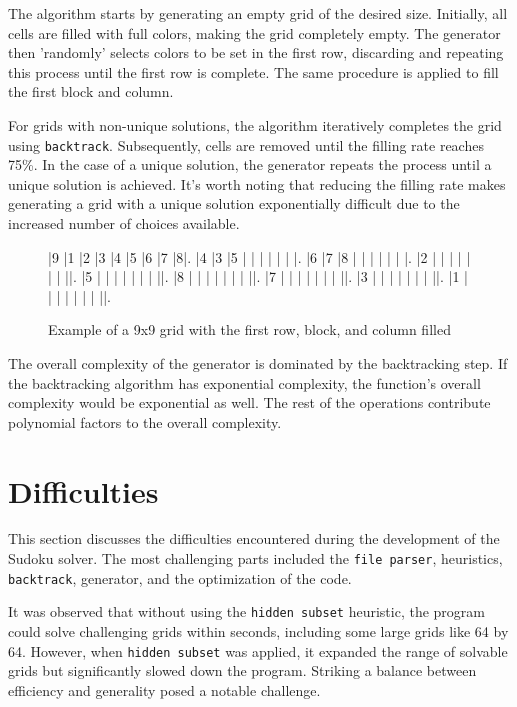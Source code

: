\documentclass[a4paper, 11pt]{article}
\begin{document}
The algorithm starts by generating an empty grid of the desired size. Initially, all cells are filled with full colors, making the grid completely empty. The generator then 'randomly' selects colors to be set in the first row, discarding and repeating this process until the first row is complete. The same procedure is applied to fill the first block and column.

For grids with non-unique solutions, the algorithm iteratively completes the grid using \texttt{backtrack}. Subsequently, cells are removed until the filling rate reaches 75\%. In the case of a unique solution, the generator repeats the process until a unique solution is achieved. It's worth noting that reducing the filling rate makes generating a grid with a unique solution exponentially difficult due to the increased number of choices available.


\begin{figure}[h]
  \centering
  \begin{sudoku}
    |9 |1 |2 |3 |4 |5 |6 |7 |8|.
    |4 |3 |5 | | | | | | |.
    |6 |7 |8 | | | | | | |.
    |2 | | | | | | | ||.
    |5 | | | | | | | ||.
    |8 | | | | | | | ||.
    |7 | | | | | | | ||.
    |3 | | | | | | | ||.
    |1 | | | | | | | ||.
  \end{sudoku}
  \caption{Example of a 9x9 grid with the first row, block, and column filled}
\end{figure}

The overall complexity of the generator is dominated by the backtracking step. If the backtracking algorithm has exponential complexity, the function's overall complexity would be exponential as well. The rest of the operations contribute polynomial factors to the overall complexity.

\section{Difficulties}
\par This section discusses the difficulties encountered during the development of the Sudoku solver. The most challenging parts included the \texttt{file parser}, heuristics, \texttt{backtrack}, generator, and the optimization of the code.

\par It was observed that without using the \texttt{hidden subset} heuristic, the program could solve challenging grids within seconds, including some large grids like 64 by 64. However, when \texttt{hidden subset} was applied, it expanded the range of solvable grids but significantly slowed down the program. Striking a balance between efficiency and generality posed a notable challenge.
\end{document}
